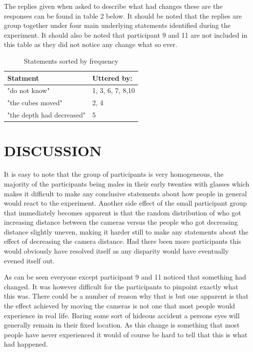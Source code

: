 \documentclass[tog]{acmsiggraph}
\begin{document}
	
		The replies given when asked to describe what had changes these are the responses can be found in table 2 below. It should be noted that the replies are group together under four main underlying statements identified during the experiment. It should also be noted that participant 9 and 11 are not included in this table as they did not notice any change what so ever.
		
	\begin{table}[H]
		\centering
		\caption{Statements sorted by frequency}
		\label{Answers}
		\begin{tabular}{@{}ll@{}}
		\toprule
		Statment                  & Uttered by:      \\ \midrule
		"do not know"             & 1, 3, 6, 7, 8,10 \\
		"the cubes moved"         & 2, 4             \\
		"the depth had decreased" & 5                \\ \bottomrule
	\end{tabular}
\end{table}
		
		
	

\section{DISCUSSION}
It is easy to note that the group of participants is very homogeneous, the majority of the participants being males in their early twenties  with glasses which makes it difficult to make any conclusive statements about how people in general would react to the experiment. Another side effect of the small participant group that immediately becomes apparent is that the random distribution of who got increasing distance between the cameras versus the people who got decreasing distance slightly uneven, making it harder still to make any statements about the effect of decreasing the camera distance. Had there been more participants this would obviously have resolved itself as any disparity would have eventually evened itself out. 

As can be seen everyone except participant 9 and 11 noticed that something had changed. It was however difficult for the participants to pinpoint exactly what this was. There could be a number of reason why that is but one apparent is that the effect achieved by moving the cameras is not one that most people would experience in real life. Baring some sort of hideous accident a persons eyes will generally remain in their fixed location. As this change is something that most people have never experienced it would of course be hard to tell that this is what had happened. 
\end{document}
